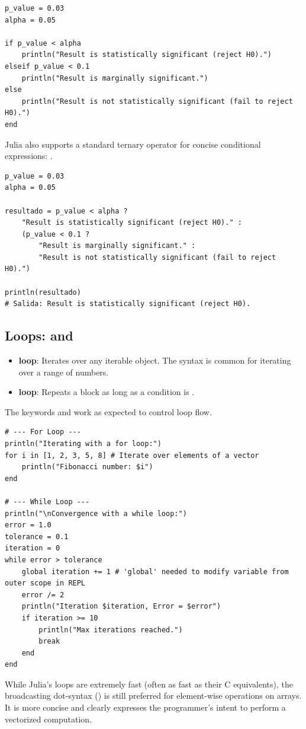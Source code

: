 \text{ }\begin{verbatim}
p_value = 0.03
alpha = 0.05

if p_value < alpha
    println("Result is statistically significant (reject H0).")
elseif p_value < 0.1
    println("Result is marginally significant.")
else
    println("Result is not statistically significant (fail to reject H0).")
end
\end{verbatim}
Julia also supports a standard ternary operator for concise conditional expressions: .

\begin{verbatim}
p_value = 0.03
alpha = 0.05

resultado = p_value < alpha ?
    "Result is statistically significant (reject H0)." :
    (p_value < 0.1 ?
        "Result is marginally significant." :
        "Result is not statistically significant (fail to reject H0).")

println(resultado)
# Salida: Result is statistically significant (reject H0).
\end{verbatim}

\subsection*{Loops:  and }
\begin{itemize}
    \item \textbf{ loop}: Iterates over any iterable object. The syntax  is common for iterating over a range of numbers.
    \item \textbf{ loop}: Repeats a block as long as a condition is .
\end{itemize}
The keywords  and  work as expected to control loop flow.

\begin{example}
\text{ }\begin{verbatim}
# --- For Loop ---
println("Iterating with a for loop:")
for i in [1, 2, 3, 5, 8] # Iterate over elements of a vector
    println("Fibonacci number: $i")
end

# --- While Loop ---
println("\nConvergence with a while loop:")
error = 1.0
tolerance = 0.1
iteration = 0
while error > tolerance
    global iteration += 1 # 'global' needed to modify variable from outer scope in REPL
    error /= 2
    println("Iteration $iteration, Error = $error")
    if iteration >= 10
        println("Max iterations reached.")
        break
    end
end
\end{verbatim}
\end{example}
\begin{remark}
While Julia's loops are extremely fast (often as fast as their C equivalents), the broadcasting dot-syntax () is still preferred for element-wise operations on arrays. It is more concise and clearly expresses the programmer's intent to perform a vectorized computation.
\end{remark}

